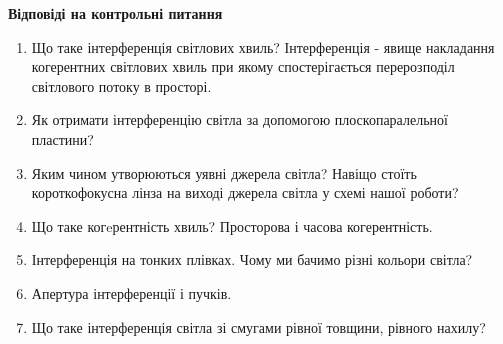 \begin{center}
    \Large{\textbf{Відповіді на контрольні питання}}    
\end{center}

\vspace{1mm}

\begin{enumerate}
    \item Що таке інтерференція світлових хвиль?
    \bigbreak
    Інтерференція - явище накладання когерентних світлових хвиль при якому спостерігається перерозподіл світлового потоку в просторі.

    \item Як отримати інтерференцію світла за допомогою плоскопаралельної пластини?
    \bigbreak


    \item Яким чином утворюються уявні джерела світла? Навіщо стоїть 
    короткофокусна лінза на виході джерела світла у схемі нашої роботи?
    \bigbreak

    \item Що таке когeрентність хвиль? Просторова і часова когерентність.
    \bigbreak

    
    \item Інтерференція на тонких плівках. Чому ми бачимо різні кольори світла?
    \bigbreak

    
    \item Апертура інтерференції і пучків.
    \bigbreak


    \item Що таке інтерференція світла зі смугами рівної товщини, рівного нахилу?
    \bigbreak


\end{enumerate}